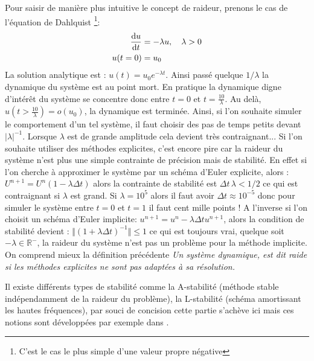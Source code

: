 \begin{exemple}
    Pour saisir de manière plus intuitive le concept de raideur, prenons le cas de l'équation de Dahlquist
    \footnote{C'est le cas le plus simple d'une valeur propre négative}:
    \begin{align}
        \frac{\text d u }{\text d t} &= - \lambda u,\quad \lambda > 0\\\notag
        u(t=0)&=u_0
    \end{align}
    La solution analytique est : $u(t) = u_0 e^{-\lambda t}$. Ainsi passé quelque $ 1/\lambda$ la dynamique du système est au point mort. 
    En pratique la dynamique digne d'intérêt du système se concentre donc entre $t=0$ et $t=\frac{10}{\lambda}$. 
    Au delà, $u(t>\frac{10}{\lambda}) = o(u_0)$, la dynamique est terminée.
    Ainsi, si l'on souhaite simuler le comportement d'un tel système, il faut choisir des pas de temps petits devant $\vert \lambda \vert^{-1}$.
    Lorsque $\lambda$ est de grande amplitude cela devient très contraignant... Si l'on souhaite utiliser des méthodes explicites, c'est encore pire car la raideur du système 
    n'est plus une simple contrainte de précision mais de stabilité. En effet si l'on cherche à approximer le système par un schéma d'Euler explicite, alors : 
    $U^{n+1} = U^n (1 - \lambda \Delta t)$ alors la contrainte de stabilité est $\Delta t \, \lambda < 1/2$ ce qui est contraignant si $\lambda$ est grand. 
    Si $\lambda = 10^5$ alors il faut avoir $\Delta t \approx 10^{-5}$ donc pour simuler le système entre $t=0$ et $t=1$ il faut cent mille points !
    A l'inverse si l'on choisit un schéma d'Euler implicite: $u^{n+1} = u^n - \lambda \Delta t u^{n+1}$, alors la condition de stabilité devient : 
    $\Vert(1+\lambda \Delta t)^{-1}\Vert \leq 1$ ce qui est toujours vrai, quelque soit $- \lambda \in \mathbb{R}^-$, la raideur du système n'est pas un problème pour la méthode implicite.
    On comprend mieux la définition précédente \textit{Un système dynamique, est dit raide si les méthodes explicites ne sont pas adaptées à sa résolution.}
\end{exemple}
Il existe différents types de stabilité comme la A-stabilité (méthode stable indépendamment de la raideur du problème), la L-stabilité (schéma amortissant les hautes fréquences),
par souci de concision cette partie s'achève ici mais ces notions sont développées par exemple dans \cite{HairerAndWanner1}.